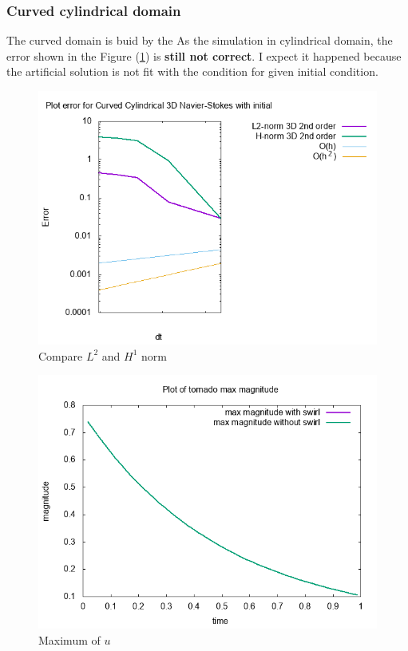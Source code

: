 \documentclass[a4paper]{article}
\begin{document}
\subsubsection{Curved cylindrical domain}
The curved domain is buid by the 
As the simulation in cylindrical domain, the error shown in the Figure (\ref{fig:errorcurved}) is \textbf{still not correct}. I expect it happened because the artificial solution is not fit with the condition for given initial condition.
\begin{figure}[h!]
	\centering
	\includegraphics[width=1\linewidth]{NS_3D/error_curved}
	\caption{Compare $ L^{2} $ and $ H^{1} $ norm}
	\label{fig:errorcurved}
\end{figure}
\begin{figure}[h!]
	\centering
	\includegraphics[width=1\linewidth]{NS_3D/curved}
	\caption{Maximum of $ u $}
	\label{fig:curved}
\end{figure}
\end{document}
